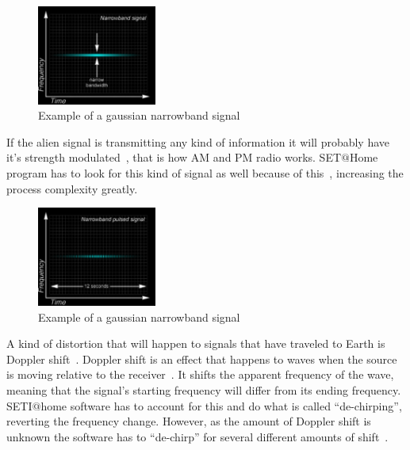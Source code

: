 \begin{figure}[!htb]
        \centering
        \includegraphics[width=0.35\textwidth]{figures/narrow.pdf}
        \caption{Example of a gaussian narrowband
        signal~\cite{hid-sp18-601-www-sathome-howworks}}\label{broadbandfigure}
\end{figure}
 
 If the alien signal is transmitting any kind of information it will probably 
 have it's strength modulated~\cite{hid-sp18-601-book-gray1961radio}, that is
 how AM and PM radio works. SET$@$Home program has to look for this kind of 
 signal as well because of 
 this~\cite{hid-sp18-601-www-sathome-howworks}, increasing the process 
 complexity greatly.

\begin{figure}[!htb]
        \centering
        \includegraphics[width=0.35\textwidth]{figures/narrow_pulsed.pdf}
        \caption{Example of a gaussian narrowband
        signal~\cite{hid-sp18-601-www-sathome-howworks}}\label{narrowbandfigure}
\end{figure}

 A kind of distortion that will happen to signals that have traveled to Earth
 is Doppler shift~\cite{hid-sp18-601-www-doppler-light}. Doppler shift is an 
 effect that happens to waves when the 
 source is moving relative to the receiver~\cite{hid-sp18-601-www-doppler}. 
 It shifts the apparent frequency 
 of the wave, meaning that the signal's starting frequency will differ from its 
 ending frequency. SETI$@$home software has to account for this and do what 
 is called ``de-chirping'', reverting the frequency change. However, as the 
 amount of Doppler shift is unknown  the software has to ``de-chirp'' for
 several  different amounts of shift~\cite{hid-sp18-601-www-sathome-howworks}.

